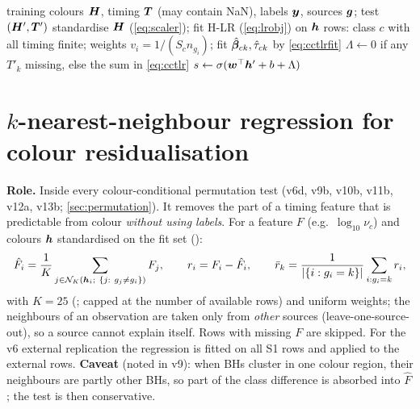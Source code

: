 \begin{algorithm}[htbp]
\caption{CCTLR fit and score}\label{alg:cctlr}
\begin{algorithmic}[1]
\Require training colours $\bm{H}$, timing $\bm{T}$ (may contain NaN), labels $\bm{y}$, sources $\bm{g}$; test $(\bm{H}',\bm{T}')$
\State standardise $\bm{H}$ (\cref{eq:scaler}); fit H-LR (\cref{eq:lrobj}) on $\bm{h}$
   \State rows: class $c$ with all timing finite; weights $v_i=1/(S_c n_{g_i})$; fit $\hat{\bm{\beta}}_{ck},\hat\tau_{ck}$ by \cref{eq:cctlrfit}
\EndFor
{}
   \State $\Lambda\gets0$ if any $T'_k$ missing, else the sum in \cref{eq:cctlr}
   \State $s\gets\sigma(\bm{w}^\top\bm{h}'+b+\Lambda)$
\EndFor
\end{algorithmic}
\end{algorithm}

\section{$k$-nearest-neighbour regression for colour residualisation}\label{sec:knnreg}
\textbf{Role.} Inside every colour-conditional permutation test (v6d, v9b, v10b, v11b, v12a, v13b; \cref{sec:permutation}).
It removes the part of a timing feature that is predictable from colour \emph{without using labels}. For a feature
$F$ (e.g.\ $\log_{10}\nu_c$) and colours $\bm{h}$ standardised on the fit set ():
\begin{equation}
\hat F_i = \frac1K\sum_{j\in\mathcal N_K(\bm{h}_i;\ \{j:\ g_j\ne g_i\})}F_j,\qquad r_i = F_i-\hat F_i,\qquad
\bar r_k=\frac{1}{|\{i:g_i=k\}|}\sum_{i:g_i=k} r_i ,\label{eq:knnreg}
\end{equation}
with $K=25$ (; capped at the number of available rows) and uniform weights; the neighbours of an observation
are taken only from \emph{other} sources (leave-one-source-out), so a source cannot explain itself. Rows with missing $F$
are skipped. For the v6 external replication the regression is fitted on all S1 rows and applied to the external rows.
\textbf{Caveat} (noted in v9): when BHs cluster in one colour region, their neighbours are partly other BHs, so part of the
class difference is absorbed into $\hat F$; the test is then conservative.

